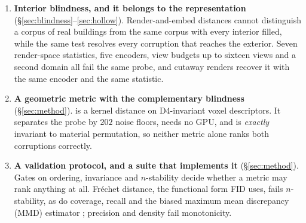 \begin{enumerate}[leftmargin=*,itemsep=1pt,topsep=2pt]

\item \textbf{Interior blindness, and it belongs to the representation}
(\S\ref{sec:blindness}--\ref{sec:hollow}). Render-and-embed distances cannot
distinguish a corpus of real buildings from the same corpus with every interior
filled, while the same test resolves every corruption that reaches the exterior.
Seven render-space statistics, five encoders, view budgets up to sixteen views
and a second domain all fail the same probe, and cutaway renders recover it with the same encoder
and the same statistic.

\item \textbf{A geometric metric with the complementary blindness}
(\S\ref{sec:method}). \vkid{} is a kernel distance on D4-invariant voxel
descriptors. It separates the probe by $202$ noise floors, needs no GPU, and is
\emph{exactly} invariant to material permutation, so neither metric alone ranks
both corruptions correctly.

\item \textbf{A validation protocol, and a suite that implements it}
(\S\ref{sec:method}). Gates on ordering, invariance and $n$-stability decide
whether a metric may rank anything at all. Fr\'echet distance, the functional form FID
uses, fails $n$-stability, as do coverage, recall and the biased maximum mean discrepancy
(MMD) estimator \citep{jayasumana2024cmmd}; precision and density
\citep{naeem2020prdc,kynkaanniemi2019precision} fail monotonicity.

\end{enumerate}
